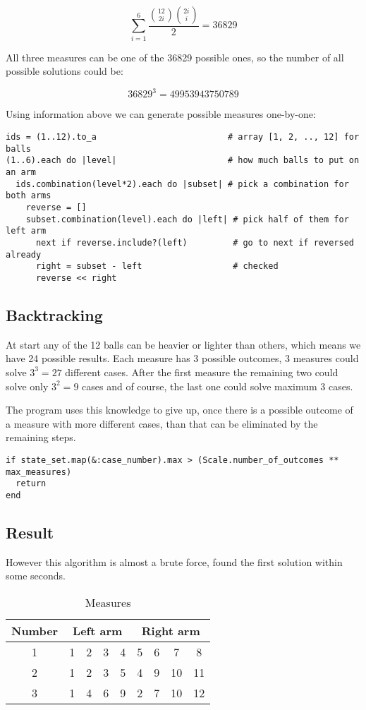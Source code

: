 \documentclass[11pt]{article} %
\begin{document}
\[ \sum_{i=1}^{6} \frac{\binom{12}{2i} \binom{2i}{i}}{2} = 36829 \]

All three measures can be one of the 36829 possible ones, so the number of all possible solutions could be:

\[ 36829^3 = 49953943750789 \]

Using information above we can generate possible measures one-by-one:

\begin{verbatim}
ids = (1..12).to_a                          # array [1, 2, .., 12] for balls
(1..6).each do |level|                      # how much balls to put on an arm
  ids.combination(level*2).each do |subset| # pick a combination for both arms
    reverse = []
    subset.combination(level).each do |left| # pick half of them for left arm
      next if reverse.include?(left)         # go to next if reversed already
      right = subset - left                  # checked
      reverse << right
\end{verbatim}

\subsection{Backtracking}

At start any of the 12 balls can be heavier or lighter than others, which means we have 24 possible results. Each measure has 3 possible outcomes, 3 measures could solve $3^3 = 27$ different cases. After the first measure the remaining two could solve only $3^2 = 9$ cases and of course, the last one could solve maximum 3 cases.

The program uses this knowledge to give up, once there is a possible outcome of a measure with more different cases, than that can be eliminated by the remaining steps.

\begin{verbatim}
if state_set.map(&:case_number).max > (Scale.number_of_outcomes ** max_measures)
  return
end
\end{verbatim}

\subsection{Result}

However this algorithm is almost a brute force, found the first solution within some seconds.

\begin{table}[ht]
\begin{center}
\begin{tabular}{|c|cccc|cccc|}
  \hline
  Number & \multicolumn{4}{c|}{Left arm} & \multicolumn{4}{c|}{Right arm} \\
  \hline
       1 & 1 & 2 & 3 & 4 & 5 & 6 & 7 & 8 \\
       2 & 1 & 2 & 3 & 5 & 4 & 9 & 10 & 11 \\
       3 & 1 & 4 & 6 & 9 & 2 & 7 & 10 & 12 \\
  \hline
\end{tabular}
\end{center}
\caption{Measures}
\end{table}
\end{document}
